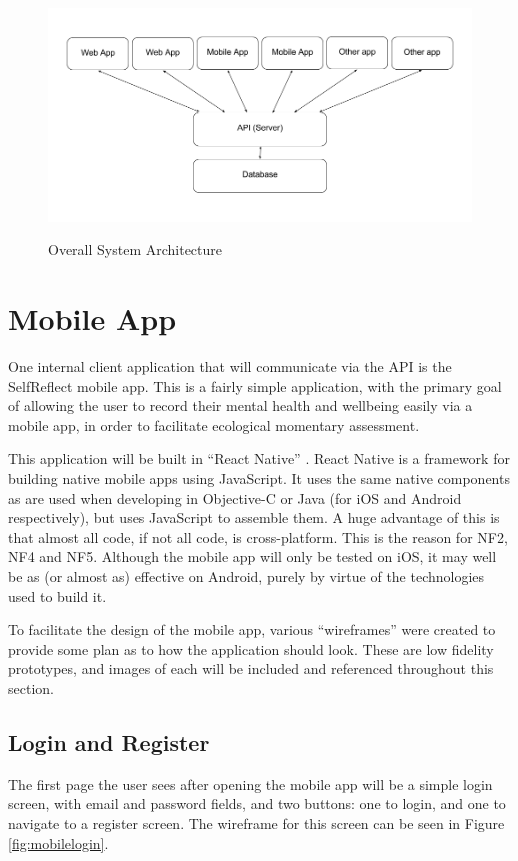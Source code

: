 \documentclass[11pt,openright,a4paper]{report}
\begin{document}
\begin{figure}[ht]
\centering
\caption{Overall System Architecture}
\includegraphics[width=\textwidth]{i/OverallSystem.png}
\label{fig:OverallSystem}
\end{figure}

\newpage
\section{Mobile App}
One internal client application that will communicate via the API is the SelfReflect mobile app. This is a fairly simple application, with the primary goal of allowing the user to record their mental health and wellbeing easily via a mobile app, in order to facilitate ecological momentary assessment.

This application will be built in \enquote{React Native} \parencite{reactnative}. React Native is a framework for building native mobile apps using JavaScript. It uses the same native components as are used when developing in Objective-C or Java (for iOS and Android respectively), but uses JavaScript to assemble them. A huge advantage of this is that almost all code, if not all code, is cross-platform. This is the reason for NF2, NF4 and NF5. Although the mobile app will only be tested on iOS, it may well be as (or almost as) effective on Android, purely by virtue of the technologies used to build it.

To facilitate the design of the mobile app, various \enquote{wireframes} were created to provide some plan as to how the application should look. These are low fidelity prototypes, and images of each will be included and referenced throughout this section.

\subsection{Login and Register}
The first page the user sees after opening the mobile app will be a simple login screen, with email and password fields, and two buttons: one to login, and one to navigate to a register screen. The wireframe for this screen can be seen in Figure \ref{fig:mobilelogin}.
\end{document}

